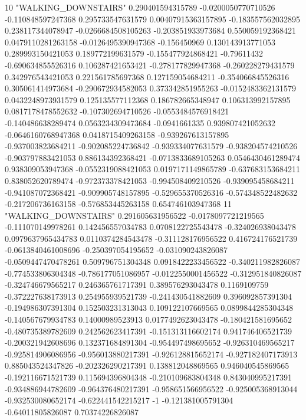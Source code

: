 10 "WALKING_DOWNSTAIRS" 0.290401594315789 -0.0200050770710526 -0.110848597247368 0.295733547631579 0.00407915363157895 -0.183557562032895 0.238117344078947 -0.0266684508105263 -0.203851933973684 0.550059192368421 0.0479110281263158 -0.0126495390947368 -0.156450969 0.130143913771053 0.289993150421053 0.189772199631579 -0.155477924868421 -0.79611432 -0.690634855526316 0.106287421653421 -0.278177829947368 -0.260228279431579 0.342976543421053 0.221561785697368 0.127159054684211 -0.354066845526316 0.305061414973684 -0.290672934582053 0.373342851955263 -0.0152483362131579 0.0432248973931579 0.125135577112368 0.186782665348947 0.106313992157895 0.0817178478552632 -0.107302694710526 -0.0553484576918421 -0.140486638289474 0.0563234309473684 -0.0941661335 0.939807421052632 -0.0646160768947368 0.0418715409263158 -0.939267613157895 -0.937003823684211 -0.902085224736842 -0.939334077631579 -0.938204574210526 -0.903797883421053 0.886134392368421 -0.0713833689105263 0.0546430461289474 0.938309053947368 -0.0552319088421053 0.0197171149865789 -0.637683153684211 0.838052620789474 -0.972373378421053 -0.994508409210526 -0.939095458684211 -0.941087072368421 -0.909905748157895 -0.529655370526316 -0.574348522482632 -0.217206736163158 -0.576853445263158 0.654746103947368
11 "WALKING_DOWNSTAIRS" 0.291605631956522 -0.0178097721219565 -0.111070149978261 0.142456557034783 0.0708122725543478 -0.324026938043478 0.0979637965434783 0.0110374284543478 -0.311128176956522 0.416724176521739 -0.0613840461008696 -0.250397054195652 -0.031090243826087 -0.0509447470478261 0.509796751304348 0.0918422233456522 -0.340211982826087 -0.774533806304348 -0.786177051086957 -0.0122550001456522 -0.312951840826087 -0.324746679565217 0.246365761717391 0.389576293043478 0.1169109759 -0.372227638173913 0.254955939521739 -0.241430541882609 0.396092857391304 -0.194986307391304 0.152503231313043 0.109122107669565 0.0899844285304348 -0.140567679934783 0.14000989523913 0.0177492623043478 -0.180421581695652 -0.480735389782609 0.242562623417391 -0.151313116602174 0.941746406521739 -0.200321942608696 0.132371684891304 -0.954497498695652 -0.926310469565217 -0.925814906086956 -0.956013880217391 -0.926128815652174 -0.927182407173913 0.885043524347826 -0.202326290217391 0.138812048869565 0.946040545869565 -0.192116671521739 0.115694396804348 -0.210109683804348 0.843040995217391 -0.934886944782609 -0.964376480217391 -0.958651566956522 -0.925005368913044 -0.932530080652174 -0.622441542215217 -1 -0.121381005791304 -0.64011805826087 0.70374226826087
